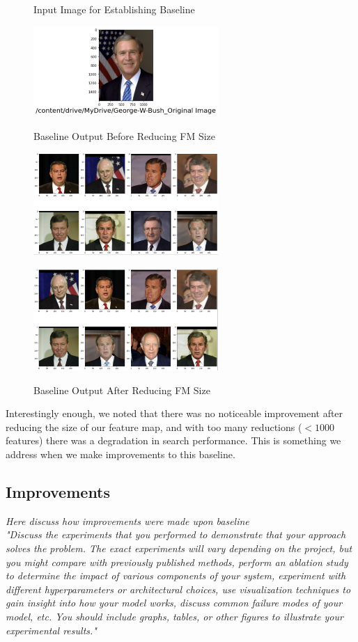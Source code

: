 \documentclass[conference]{IEEEtran}
\begin{document}
\begin{figure}[h]
    \centering
    \caption{Input Image for Establishing Baseline}
    \includegraphics[width=7cm]{gwbush.png}
    \label{fig:2}

    \caption{Baseline Output Before Reducing FM Size}
    \includegraphics[width=7cm]{og_baseline.png}
    \label{fig:3}
    
    \caption{Baseline Output After Reducing FM Size}
    \includegraphics[width=7cm]{pca_baseline.png}
    \label{fig:4}
    \centering
\end{figure}

Interestingly enough, we noted that there was no noticeable improvement after reducing the size of our feature map, and with too many reductions ($<1000$ features) there was a degradation in search performance. This is something we address when we make improvements to this baseline.

\subsection{Improvements}
\textit{Here discuss how improvements were made upon baseline}\\

\textit{"Discuss the experiments that you performed to demonstrate that your approach solves the problem. The exact experiments will vary depending on the project, but you might compare with previously published methods, perform an ablation study to determine the impact of various components of your system, experiment with different hyperparameters or architectural choices, use visualization techniques to gain insight into how your model works, discuss common failure modes of your model, etc. You should include graphs, tables, or other figures to illustrate your experimental results."}
\end{document}

